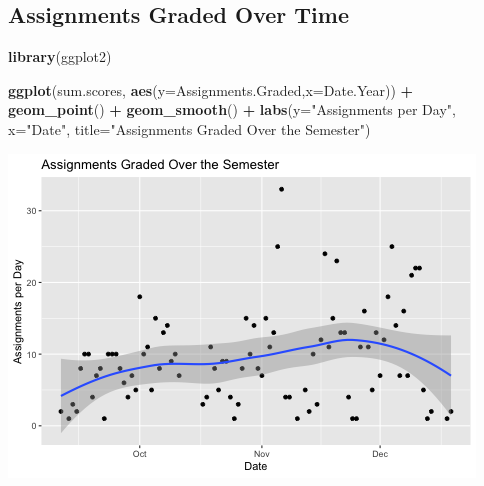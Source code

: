 \documentclass[]{article}
\newenvironment{Shaded}{\begin{snugshade}}{\end{snugshade}}
\newcommand{\KeywordTok}[1]{\textcolor[rgb]{0.13,0.29,0.53}{\textbf{#1}}}
\newcommand{\DataTypeTok}[1]{\textcolor[rgb]{0.13,0.29,0.53}{#1}}
\newcommand{\StringTok}[1]{\textcolor[rgb]{0.31,0.60,0.02}{#1}}
\newcommand{\OperatorTok}[1]{\textcolor[rgb]{0.81,0.36,0.00}{\textbf{#1}}}
\newcommand{\NormalTok}[1]{#1}
\begin{document}
\subsection{Assignments Graded Over
Time}\label{assignments-graded-over-time}

\begin{Shaded}
\begin{Highlighting}[]
\KeywordTok{library}\NormalTok{(ggplot2)}

\KeywordTok{ggplot}\NormalTok{(sum.scores, }\KeywordTok{aes}\NormalTok{(}\DataTypeTok{y=}\NormalTok{Assignments.Graded,}\DataTypeTok{x=}\NormalTok{Date.Year)) }\OperatorTok{+}
\StringTok{  }\KeywordTok{geom_point}\NormalTok{() }\OperatorTok{+}
\StringTok{  }\KeywordTok{geom_smooth}\NormalTok{() }\OperatorTok{+}
\StringTok{  }\KeywordTok{labs}\NormalTok{(}\DataTypeTok{y=}\StringTok{"Assignments per Day"}\NormalTok{,}
       \DataTypeTok{x=}\StringTok{"Date"}\NormalTok{,}
       \DataTypeTok{title=}\StringTok{"Assignments Graded Over the Semester"}\NormalTok{)}
\end{Highlighting}
\end{Shaded}

\includegraphics{figures/assignments-graded-1.png}

\begin{Shaded}
\end{Shaded}
\end{document}

